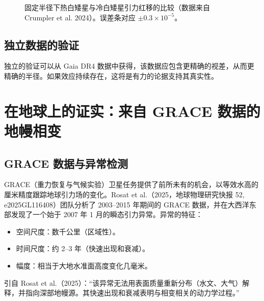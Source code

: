 \documentclass[12pt]{article}
\theoremstyle{remark}
\begin{document}
	\begin{figure}[htbp]
		\centering
		\caption{固定半径下热白矮星与冷白矮星引力红移的比较（数据来自 Crumpler et al. 2024）。误差条对应 $\pm0.3\times10^{-5}$。}
		\label{fig:wd-redshift}
	\end{figure}
	
	\subsection{独立数据的验证}
	\label{subsec:wd-verification}
	
	独立的验证可以从 Gaia DR4 数据中获得，该数据应包含更精确的视差，从而更精确的半径。如果效应持续存在，这将是有力的论据支持其真实性。
	
	\section{在地球上的证实：来自 GRACE 数据的地幔相变}
	\label{sec:grace}
	
	\subsection{GRACE 数据与异常检测}
	\label{subsec:grace-data}
	
	GRACE（重力恢复与气候实验）卫星任务提供了前所未有的机会，以等效水高的厘米精度跟踪地球引力场的变化。Rosat et al.（2025，地球物理研究快报 52, e2025GL116408）团队分析了 2003–2015 年期间的 GRACE 数据，并在大西洋东部发现了一个始于 2007 年 1 月的瞬态引力异常。异常的特征：
	\begin{itemize}
		\item 空间尺度：数千公里（区域性）。
		\item 时间尺度：约 2–3 年（快速出现和衰减）。
		\item 幅度：相当于大地水准面高度变化几毫米。
	\end{itemize}
	引自 Rosat et al.（2025）：“该异常无法用表面质量重新分布（水文、大气）解释，并指向深部地幔源。其快速出现和衰减表明与相变相关的动力学过程。”
	
\end{document}
